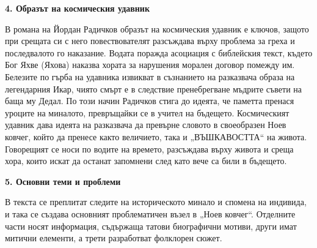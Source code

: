 \documentclass[12pt,a4paper]{article}
\begin{document}
\textbf{4. Образът на космическия удавник}
\vspace{0.1cm}
  
\indent В романа на Йордан Радичков образът на космическия удавник е ключов, защото при срещата си с него повествователят разсъждава върху проблема за греха и последвалото го наказание. Водата поражда асоциация с библейския текст, където Бог Яхве (Яхова) наказва хората за нарушения морален договор помежду им. Белезите по гърба на удавника извикват в съзнанието на разказвача образа на легендарния Икар, чиято смърт е в следствие пренебрегване мъдрите съвети на баща му Дедал. По този начин Радичков стига до идеята, че паметта пренася уроците на миналото, превръщайки се в учител на бъдещето. Космическият удавник дава идеята на разказвача да превърне словото в своеобразен Ноев ковчег, който да пренесе както величието, така и „ВЪШКАВОСТТА“ на живота. Говорещият се носи по водите на времето, разсъждава върху живота и среща хора, които искат да останат запомнени след като вече са били в бъдещето.
\vspace{0.1cm} 

\textbf{5. Основни теми и проблеми}
\vspace{0.1cm}
  
\indent В текста се преплитат следите на историческото минало и спомена на индивида, и така се създава основният проблематичен възел в „Ноев ковчег“. Отделните части носят информация, съдържаща татови биографични мотиви, други имат митични елементи, а трети разработват фолклорен сюжет. 
\vspace{-0.2cm}
  
\end{document}
